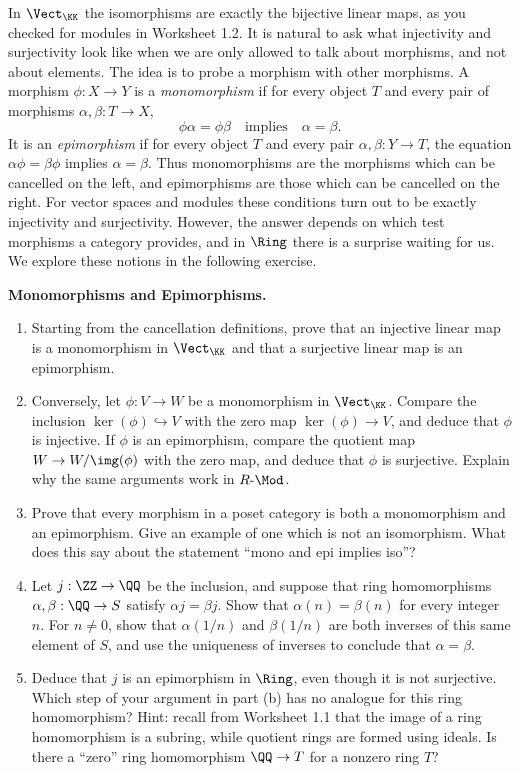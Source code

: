 \documentclass[12pt,reqno]{amsart}
\begin{document}
In $\Vect_{\KK}$ the isomorphisms are exactly the bijective linear maps, as you checked for modules in Worksheet 1.2. It is natural to ask what injectivity and surjectivity look like when we are only allowed to talk about morphisms, and not about elements. The idea is to probe a morphism with other morphisms. A morphism $\phi:X\to Y$ is a \emph{monomorphism} if for every object $T$ and every pair of morphisms $\alpha,\beta:T\to X$,
\[
\phi\alpha=\phi\beta \quad\text{implies}\quad \alpha=\beta.
\]
It is an \emph{epimorphism} if for every object $T$ and every pair $\alpha,\beta:Y\to T$, the equation $\alpha\phi=\beta\phi$ implies $\alpha=\beta$. Thus monomorphisms are the morphisms which can be cancelled on the left, and epimorphisms are those which can be cancelled on the right. For vector spaces and modules these conditions turn out to be exactly injectivity and surjectivity. However, the answer depends on which test morphisms a category provides, and in $\Ring$ there is a surprise waiting for us. We explore these notions in the following exercise.

\hrulefill

\begin{problems}
\item\label{c:monoepi} \textbf{Monomorphisms and Epimorphisms.}
\begin{enumerate}
\item Starting from the cancellation definitions, prove that an injective linear map is a monomorphism in $\Vect_{\KK}$ and that a surjective linear map is an epimorphism.
\item Conversely, let $\phi:V\to W$ be a monomorphism in $\Vect_{\KK}$. Compare the inclusion $\ker(\phi)\hookrightarrow V$ with the zero map $\ker(\phi)\to V$, and deduce that $\phi$ is injective. If $\phi$ is an epimorphism, compare the quotient map $W\to W/\img(\phi)$ with the zero map, and deduce that $\phi$ is surjective. Explain why the same arguments work in $R\text{-}\Mod$.
\item Prove that every morphism in a poset category is both a monomorphism and an epimorphism. Give an example of one which is not an isomorphism. What does this say about the statement ``mono and epi implies iso''?
\item Let $j:\ZZ\to\QQ$ be the inclusion, and suppose that ring homomorphisms $\alpha,\beta:\QQ\to S$ satisfy $\alpha j=\beta j$. Show that $\alpha(n)=\beta(n)$ for every integer $n$. For $n\ne0$, show that $\alpha(1/n)$ and $\beta(1/n)$ are both inverses of this same element of $S$, and use the uniqueness of inverses to conclude that $\alpha=\beta$.
\item Deduce that $j$ is an epimorphism in $\Ring$, even though it is not surjective. Which step of your argument in part (b) has no analogue for this ring homomorphism? Hint: recall from Worksheet 1.1 that the image of a ring homomorphism is a subring, while quotient rings are formed using ideals. Is there a ``zero'' ring homomorphism $\QQ\to T$ for a nonzero ring $T$?
\end{enumerate}
\end{problems}
\end{document}
